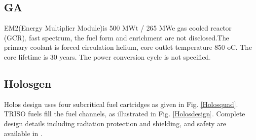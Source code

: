 \restoregeometry
\pagebreak

\subsection{GA}
EM2(Energy Multiplier Module)is 500 MWt / 265 MWe gas cooled reactor (GCR), fast spectrum, the fuel form and enrichment are not disclosed.The primary coolant is forced circulation helium, core outlet temperature 850 oC. The core lifetime is 30 years. The power conversion cycle is not specified.

\subsection{Holosgen}
Holos design uses four subcritical fuel cartridges as given in Fig. \ref{Holosquad}. TRISO fuels fill the fuel channels, as illustrated in Fig. \ref{Holosdesign}. Complete design details including radiation protection and shielding, and safety are available in \cite{filippone_holos_2017}.

